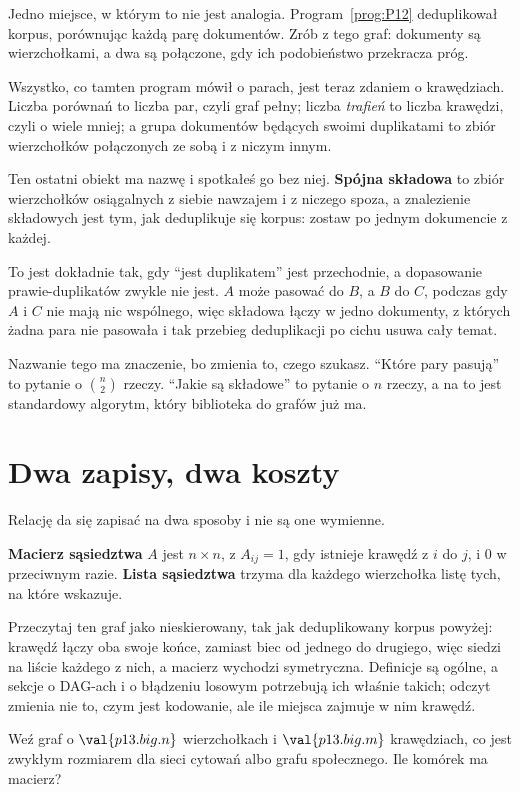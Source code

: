 \begin{fr}
Jedno miejsce, w którym to nie jest analogia. Program~\ref{prog:P12}
deduplikował korpus, porównując każdą parę dokumentów. Zrób z tego graf:
dokumenty są wierzchołkami, a dwa są połączone, gdy ich podobieństwo
przekracza próg.

Wszystko, co tamten program mówił o parach, jest teraz zdaniem o krawędziach.
Liczba porównań to liczba par, czyli graf pełny; liczba \emph{trafień} to
liczba krawędzi, czyli o wiele mniej; a grupa dokumentów będących swoimi
duplikatami to zbiór wierzchołków połączonych ze sobą i z niczym innym.

\begin{aibox}
Ten ostatni obiekt ma nazwę i spotkałeś go bez niej. \textbf{Spójna składowa}
to zbiór wierzchołków osiągalnych z siebie nawzajem i z niczego spoza, a
znalezienie składowych jest tym, jak deduplikuje się korpus: zostaw po jednym
dokumencie z każdej.

To jest dokładnie tak, gdy \enquote{jest duplikatem} jest przechodnie, a
dopasowanie prawie-duplikatów zwykle nie jest. $A$ może pasować do $B$, a $B$
do $C$, podczas gdy $A$ i $C$ nie mają nic wspólnego, więc składowa łączy w
jedno dokumenty, z których żadna para nie pasowała \dash{} i tak przebieg
deduplikacji po cichu usuwa cały temat.

Nazwanie tego ma znaczenie, bo zmienia to, czego szukasz. \enquote{Które pary
pasują} to pytanie o $\binom{n}{2}$ rzeczy. \enquote{Jakie są składowe} to
pytanie o $n$ rzeczy, a na to jest standardowy algorytm, który biblioteka do
grafów już ma.
\end{aibox}
\end{fr}

\section{Dwa zapisy, dwa koszty}
\label{sec:P13-encodings}

\begin{fr}
Relację da się zapisać na dwa sposoby i nie są one wymienne.

\textbf{Macierz sąsiedztwa} $A$ jest $n \times n$, z $A_{ij} = 1$, gdy istnieje
krawędź z $i$ do $j$, i $0$ w przeciwnym razie. \textbf{Lista sąsiedztwa}
trzyma dla każdego wierzchołka listę tych, na które wskazuje.

Przeczytaj ten graf jako nieskierowany, tak jak deduplikowany korpus powyżej:
krawędź łączy oba swoje końce, zamiast biec od jednego do drugiego, więc siedzi
na liście każdego z nich, a macierz wychodzi symetryczna. Definicje są ogólne,
a sekcje o DAG-ach i o błądzeniu losowym potrzebują ich właśnie takich; odczyt
zmienia nie to, czym jest kodowanie, ale ile miejsca zajmuje w nim krawędź.

Weź graf o $\val{p13.big.n}$ wierzchołkach i $\val{p13.big.m}$ krawędziach, co
jest zwykłym rozmiarem dla sieci cytowań albo grafu społecznego. Ile komórek
ma macierz?
\dotline
\nextframe
\end{fr}

